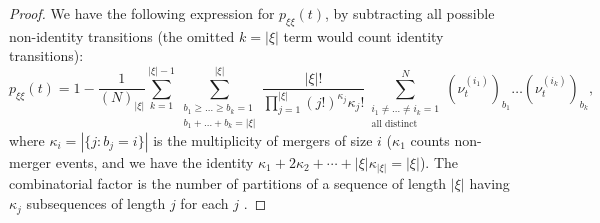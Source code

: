 \begin{proof}
We have the following expression for $p_{\xi\xi}(t)$, by subtracting all possible non-identity transitions (the omitted $k=|\xi|$ term would count identity transitions):
\begin{equation*}
p_{ \xi \xi }( t ) 
= 1 - \frac{ 1 }{ ( N )_{ | \xi | } } \sum_{ k = 1 }^{ | \xi | - 1 } 
        \sum_{ \substack{ b_1 \geq \ldots \geq b_k = 1 
        \\ b_1 + \ldots + b_k = | \xi | } }^{ | \xi | } 
        \frac{ | \xi |! }{ \prod_{ j = 1 }^{ | \xi | } ( j ! )^{ \kappa_j } \kappa_j ! } 
        \sum_{ \substack{ i_1 \neq \ldots \neq i_k = 1 \\ \text{all distinct} } }^N 
        ( \nu_t^{ ( i_1 ) } )_{ b_1 } \ldots ( \nu_t^{ ( i_k ) } )_{ b_k },
\end{equation*}
where $\kappa_i = |\{ j : b_j = i \}|$ is the multiplicity of mergers of size $i$ ($\kappa_1$ counts non-merger events, and we have the identity $\kappa_1 + 2 \kappa_2 + \cdots + | \xi | \kappa_{ | \xi | } = | \xi |$).
The combinatorial factor is the number of partitions of a sequence of length $|\xi|$  having $\kappa_j$ subsequences of length $j$ for each $j$ \parencite[Equation (11)]{fu2006}.


\end{proof}
